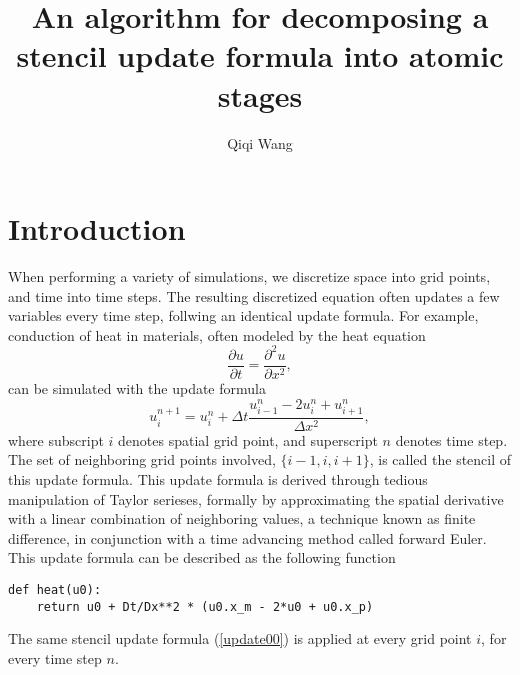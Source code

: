 \documentclass[12pt]{article}
\title{An algorithm for decomposing a stencil update formula into atomic stages}
\author{Qiqi Wang}
\begin{document}
\maketitle

\section{Introduction}
When performing a variety of simulations, we discretize space into grid points, and time into time steps.  The resulting discretized equation often updates a few variables every time step, follwing an identical update formula.  For example, conduction of heat in materials, often modeled by the heat equation
\begin{equation}
\frac{\partial u}{\partial t} = \frac{\partial^2 u}{\partial x^2},
\end{equation}
can be simulated with the update formula
\begin{equation} \label{update00}
u_i^{n+1} = u_i^n + \Delta t \frac{u_{i-1}^n - 2 u_i^n + u_{i+1}^n}{\Delta x^2},
\end{equation}
where subscript $i$ denotes spatial grid point, and superscript $n$ denotes time step.  The set of neighboring grid points involved, $\{i-1, i, i+1\}$, is called the stencil of this update formula.
This update formula is derived through tedious manipulation of Taylor serieses, formally by approximating the spatial derivative with a linear combination of neighboring values, a technique known as finite difference, in conjunction with a time advancing method called forward Euler.
This update formula can be described as the following function
\begin{lstlisting}
def heat(u0):
    return u0 + Dt/Dx**2 * (u0.x_m - 2*u0 + u0.x_p)
\end{lstlisting}
The same stencil update formula (\ref{update00}) is applied at every grid point $i$, for every time step $n$.
\end{document}
